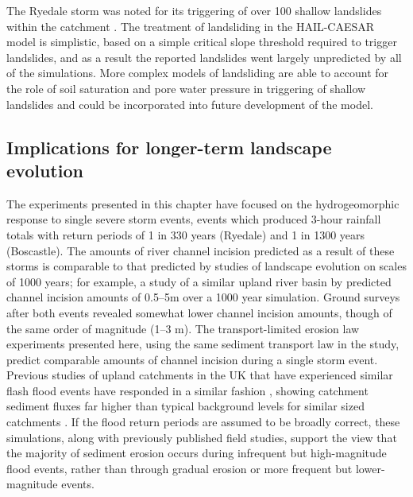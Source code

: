 The Ryedale storm was noted for its triggering of over 100 shallow landslides within the catchment \citep{galiatsatos2007assessment,dong2006evaluation,
wass2008investigation}. The treatment of landsliding in the HAIL-CAESAR model is simplistic, based on a simple critical slope threshold required to trigger landslides, and as a result the reported landslides went largely unpredicted by all of the simulations. More complex models of landsliding are able to account for the role of soil saturation and pore water pressure in triggering of shallow landslides \citep[e.g.][]{iverson2000landslide,crosta2003distributed} and could be incorporated into future development of the model. 

\subsection{Implications for longer-term landscape evolution}
The experiments presented in this chapter have focused on the hydrogeomorphic response to single severe storm events, events which produced 3-hour rainfall totals with return periods of 1 in 330 years (Ryedale) and 1 in 1300 years (Boscastle). The amounts of river channel incision predicted as a result of these storms is comparable to that predicted by studies of landscape evolution on scales of 1000 years; for example, a study of a similar upland river basin by \citet{coulthard2016sensitivity} predicted channel incision amounts of 0.5--5m over a 1000 year simulation. Ground surveys after both events \citep{wallingford2005flooding,dong2006evaluation} revealed somewhat lower channel incision amounts, though of the same order of magnitude (1--3 m). The transport-limited erosion law experiments presented here, using the same sediment transport law in the \citet{coulthard2016sensitivity} study, predict comparable amounts of channel incision during a single storm event. Previous studies of upland catchments in the UK that have experienced similar flash flood events have responded in a similar fashion \citep{johnson2002flooding,milan2012geomorphic}, showing catchment sediment fluxes far higher than typical background levels for similar sized catchments \citep[e.g.][]{johnson2002annual}. If the flood return periods are assumed to be broadly correct, these simulations, along with previously published field studies, support the view that the majority of sediment erosion occurs during infrequent but high-magnitude flood events, rather than through gradual erosion or more frequent but lower-magnitude events.

